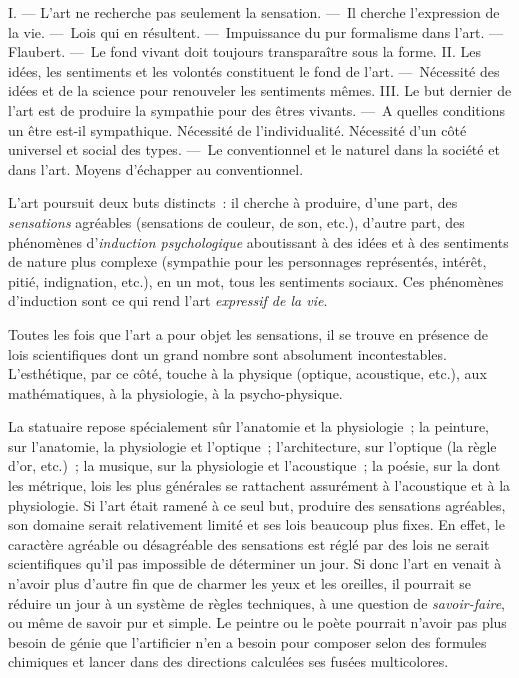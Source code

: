 \documentclass[french,twoside]{book} %
\newcommand\chaptercont{} %
\begin{document}
\chaptercont
\noindent I. — L’art ne recherche pas seulement la sensation. — Il cherche l’expression de la vie. — Lois qui en résultent. — Impuissance du pur formalisme dans l’art. — Flaubert. — Le fond vivant doit toujours transparaître sous la forme. II. Les idées, les sentiments et les volontés constituent le fond de l’art. — Nécessité des idées et de la science pour renouveler les sentiments mêmes. III. Le but dernier de l’art est de produire la sympathie pour des êtres vivants. — A quelles conditions un être est-il sympathique. Nécessité de l’individualité. Nécessité d’un côté universel et social des types. — Le conventionnel et le naturel dans la société et dans l’art. Moyens d’échapper au conventionnel.\par
L’art poursuit deux buts distincts : il cherche à produire, d’une part, des \emph{sensations} agréables (sensations de couleur, de son, etc.), d’autre part, des phénomènes d’\emph{induction psychologique} aboutissant à des idées et à des sentiments de nature plus complexe (sympathie pour les personnages représentés, intérêt, pitié, indignation, etc.), en un mot, tous les sentiments sociaux. Ces phénomènes d’induction sont ce qui rend l’art \emph{expressif de la vie}.\par
Toutes les fois que l’art a pour objet les sensations, il se trouve en présence de lois scientifiques dont un grand nombre sont absolument incontestables. L’esthétique, par ce côté, touche à la physique (optique, acoustique, etc.), aux mathématiques, à la physiologie, à la psycho-physique.\par
La statuaire repose spécialement sûr l’anatomie et la physiologie ; la peinture, sur l’anatomie, la physiologie et l’optique ; l’architecture, sur l’optique (la règle d’or, etc.) ; la musique, sur la physiologie et l’acoustique ; la poésie, sur la dont les métrique, lois les plus générales se rattachent assurément à l’acoustique et à la physiologie. Si l’art était ramené à ce seul but, produire des sensations agréables, son domaine serait relativement limité et ses lois beaucoup plus fixes. En effet, le caractère agréable ou désagréable des sensations est réglé par des lois ne serait scientifiques qu’il pas impossible de déterminer un jour. Si donc l’art en venait à n’avoir plus d’autre fin que de charmer les yeux et les oreilles, il pourrait se réduire un jour à un système de règles techniques, à une question de \emph{savoir-faire}, ou même de savoir pur et simple. Le peintre ou le poète pourrait n’avoir pas plus besoin de génie que l’artificier n’en a besoin pour composer selon des formules chimiques et lancer dans des directions calculées ses fusées multicolores.\par
\end{document}
